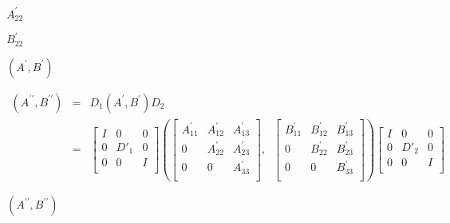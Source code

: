 {\newpage\clearpage
{}%
$A^\prime_{22}$%
\lthtmlinlinemathZ
\lthtmlcheckvsize\clearpage}

{\newpage\clearpage
{}%
$B^\prime_{22}$%
\lthtmlinlinemathZ
\lthtmlcheckvsize\clearpage}

{\newpage\clearpage
{}%
$(A^\prime,B^\prime)$%
\lthtmlinlinemathZ
\lthtmlcheckvsize\clearpage}

{\newpage\clearpage
{}%
\begin{eqnarray*}
      (A^{\prime\prime},B^{\prime\prime}) & =  &
              D_1(A^\prime,B^\prime)D_2  \\
       & = &
      \left[ \begin{array}{ccc}
          I &    0   & 0 \\
          0 & D'_1 & 0 \\
          0 &    0   & I \\\end{array} \right] \left(
       \left[
      \begin{array}{ccc}
          A^\prime_{11} & A^\prime_{12} & A^\prime_{13} \\
          0             & A^\prime_{22} & A^\prime_{23} \\
          0             &      0        & A^\prime_{33} \\\end{array}
       \right] , \;\;
       \left[
      \begin{array}{ccc}
          B^\prime_{11} & B^\prime_{12} & B^\prime_{13} \\
          0             & B^\prime_{22} & B^\prime_{23} \\
          0             &      0        & B^\prime_{33} \\
      \end{array} \right] \right) \left[
      \begin{array}{ccc}
          I &    0   & 0 \\
          0 & D'_2 & 0 \\
          0 &    0   & I \\\end{array} \right]
      \end{eqnarray*}%
\lthtmldisplayZ
\lthtmlcheckvsize\clearpage}

{\newpage\clearpage
{}%
$(A^{\prime\prime},B^{\prime\prime})$%
\lthtmlinlinemathZ
\lthtmlcheckvsize\clearpage}


